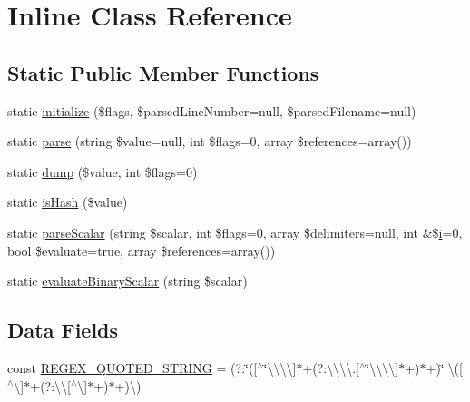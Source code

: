 \hypertarget{class_symfony_1_1_component_1_1_yaml_1_1_inline}{}\section{Inline Class Reference}
\label{class_symfony_1_1_component_1_1_yaml_1_1_inline}
\subsection*{Static Public Member Functions}
\begin{DoxyCompactItemize}
\item 
static \mbox{\hyperlink{class_symfony_1_1_component_1_1_yaml_1_1_inline_aaaa909bafd7f27f608798dc3287aeb7a}{initialize}} (\$flags, \$parsed\+Line\+Number=null, \$parsed\+Filename=null)
\item 
static \mbox{\hyperlink{class_symfony_1_1_component_1_1_yaml_1_1_inline_a4ee7b81bb64b2c0cc7a8da5e404121bb}{parse}} (string \$value=null, int \$flags=0, array \$references=array())
\item 
static \mbox{\hyperlink{class_symfony_1_1_component_1_1_yaml_1_1_inline_a2c5b5f72b99556d86f39d7ab571c9704}{dump}} (\$value, int \$flags=0)
\item 
static \mbox{\hyperlink{class_symfony_1_1_component_1_1_yaml_1_1_inline_a12a2ef2a2f6491ed9b8da49488de6661}{is\+Hash}} (\$value)
\item 
static \mbox{\hyperlink{class_symfony_1_1_component_1_1_yaml_1_1_inline_aca5776512939b9bb7ac62e60f11e5731}{parse\+Scalar}} (string \$scalar, int \$flags=0, array \$delimiters=null, int \&\$\mbox{\hyperlink{interfacei}{i}}=0, bool \$evaluate=true, array \$references=array())
\item 
static \mbox{\hyperlink{class_symfony_1_1_component_1_1_yaml_1_1_inline_a76ac0c5d0d7f16d20a8dc3ce80ae5da7}{evaluate\+Binary\+Scalar}} (string \$scalar)
\end{DoxyCompactItemize}
\subsection*{Data Fields}
\begin{DoxyCompactItemize}
\item 
const \mbox{\hyperlink{class_symfony_1_1_component_1_1_yaml_1_1_inline_a87b5c4996630ab02b80f5abece2c2fe0}{R\+E\+G\+E\+X\+\_\+\+Q\+U\+O\+T\+E\+D\+\_\+\+S\+T\+R\+I\+NG}} = \textquotesingle{}(?\+:\char`\"{}(\mbox{[}$^\wedge$\char`\"{}\textbackslash{}\textbackslash{}\textbackslash{}\textbackslash{}\mbox{]}$\ast$+(?\+:\textbackslash{}\textbackslash{}\textbackslash{}\textbackslash{}.\mbox{[}$^\wedge$\char`\"{}\textbackslash{}\textbackslash{}\textbackslash{}\textbackslash{}\mbox{]}$\ast$+)$\ast$+)\char`\"{}$\vert$\textbackslash{}\textquotesingle{}(\mbox{[}$^\wedge$\textbackslash{}\textquotesingle{}\mbox{]}$\ast$+(?\+:\textbackslash{}\textquotesingle{}\textbackslash{}\textquotesingle{}\mbox{[}$^\wedge$\textbackslash{}\textquotesingle{}\mbox{]}$\ast$+)$\ast$+)\textbackslash{}\textquotesingle{})\textquotesingle{}
\end{DoxyCompactItemize}

